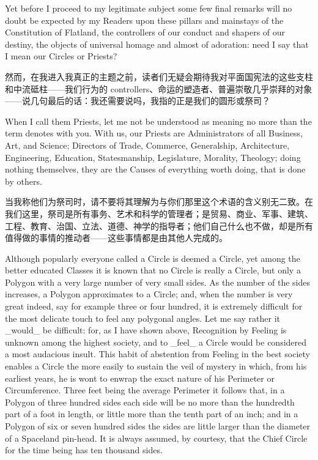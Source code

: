 \documentclass[12pt,UTF8]{ctexbook}
\begin{document}
Yet before I proceed to my legitimate subject some few final remarks will no doubt be expected by my Readers upon these pillars and mainstays of the Constitution of Flatland, the controllers of our conduct and shapers of our destiny, the objects of universal homage and almost of adoration: need I say that I mean our Circles or Priests?

然而，在我进入我真正的主题之前，读者们无疑会期待我对平面国宪法的这些支柱和中流砥柱——我们行为的 controllers、命运的塑造者、普遍崇敬几乎崇拜的对象——说几句最后的话：我还需要说吗，我指的正是我们的圆形或祭司？

When I call them Priests, let me not be understood as meaning no more than the term denotes with you. With us, our Priests are Administrators of all Business, Art, and Science; Directors of Trade, Commerce, Generalship, Architecture, Engineering, Education, Statesmanship, Legislature, Morality, Theology; doing nothing themselves, they are the Causes of everything worth doing, that is done by others.

当我称他们为祭司时，请不要将其理解为与你们那里这个术语的含义别无二致。在我们这里，祭司是所有事务、艺术和科学的管理者；是贸易、商业、军事、建筑、工程、教育、治国、立法、道德、神学的指导者；他们自己什么也不做，却是所有值得做的事情的推动者——这些事情都是由其他人完成的。

Although popularly everyone called a Circle is deemed a Circle, yet among the better educated Classes it is known that no Circle is really a Circle, but only a Polygon with a very large number of very small sides. As the number of the sides increases, a Polygon approximates to a Circle; and, when the number is very great indeed, say for example three or four hundred, it is extremely difficult for the most delicate touch to feel any polygonal angles. Let me say rather it \_would\_ be difficult: for, as I have shown above, Recognition by Feeling is unknown among the highest society, and to \_feel\_ a Circle would be considered a most audacious insult. This habit of abstention from Feeling in the best society enables a Circle the more easily to sustain the veil of mystery in which, from his earliest years, he is wont to enwrap the exact nature of his Perimeter or Circumference. Three feet being the average Perimeter it follows that, in a Polygon of three hundred sides each side will be no more than the hundredth part of a foot in length, or little more than the tenth part of an inch; and in a Polygon of six or seven hundred sides the sides are little larger than the diameter of a Spaceland pin-head. It is always assumed, by courtesy, that the Chief Circle for the time being has ten thousand sides.
\end{document}
